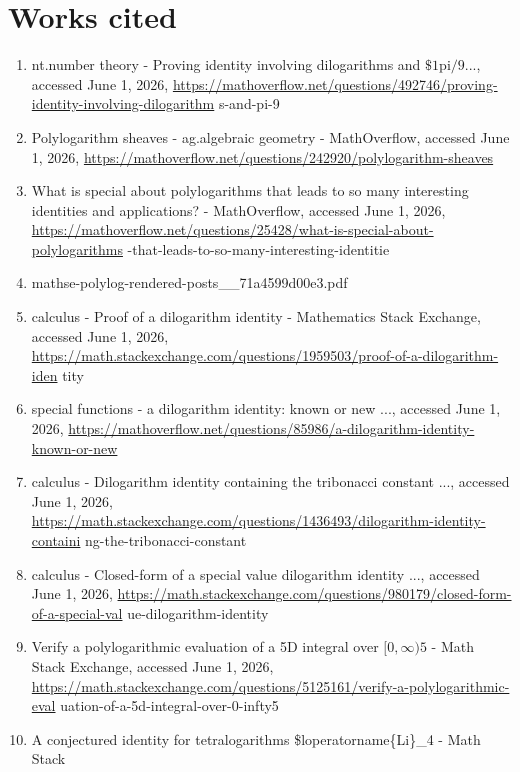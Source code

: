 \documentclass[10pt]{article}
\begin{document}
\section*{Works cited}
\begin{enumerate}
  \item nt.number theory - Proving identity involving dilogarithms and $\$ 1 \mathrm{pi} / 9$..., accessed June 1, 2026, \href{https://mathoverflow.net/questions/492746/proving-identity-involving-dilogarithm}{https://mathoverflow.net/questions/492746/proving-identity-involving-dilogarithm} s-and-pi-9
  \item Polylogarithm sheaves - ag.algebraic geometry - MathOverflow, accessed June 1, 2026, \href{https://mathoverflow.net/questions/242920/polylogarithm-sheaves}{https://mathoverflow.net/questions/242920/polylogarithm-sheaves}
  \item What is special about polylogarithms that leads to so many interesting identities and applications? - MathOverflow, accessed June 1, 2026, \href{https://mathoverflow.net/questions/25428/what-is-special-about-polylogarithms}{https://mathoverflow.net/questions/25428/what-is-special-about-polylogarithms} -that-leads-to-so-many-interesting-identitie
  \item mathse-polylog-rendered-posts\_\_71a4599d00e3.pdf
  \item calculus - Proof of a dilogarithm identity - Mathematics Stack Exchange, accessed June 1, 2026, \href{https://math.stackexchange.com/questions/1959503/proof-of-a-dilogarithm-iden}{https://math.stackexchange.com/questions/1959503/proof-of-a-dilogarithm-iden} tity
  \item special functions - a dilogarithm identity: known or new ..., accessed June 1, 2026, \href{https://mathoverflow.net/questions/85986/a-dilogarithm-identity-known-or-new}{https://mathoverflow.net/questions/85986/a-dilogarithm-identity-known-or-new}
  \item calculus - Dilogarithm identity containing the tribonacci constant ..., accessed June 1, 2026, \href{https://math.stackexchange.com/questions/1436493/dilogarithm-identity-containi}{https://math.stackexchange.com/questions/1436493/dilogarithm-identity-containi} ng-the-tribonacci-constant
  \item calculus - Closed-form of a special value dilogarithm identity ..., accessed June 1, 2026, \href{https://math.stackexchange.com/questions/980179/closed-form-of-a-special-val}{https://math.stackexchange.com/questions/980179/closed-form-of-a-special-val} ue-dilogarithm-identity
  \item Verify a polylogarithmic evaluation of a 5D integral over $[0, \infty) 5$ - Math Stack Exchange, accessed June 1, 2026, \href{https://math.stackexchange.com/questions/5125161/verify-a-polylogarithmic-eval}{https://math.stackexchange.com/questions/5125161/verify-a-polylogarithmic-eval} uation-of-a-5d-integral-over-0-infty5
  \item A conjectured identity for tetralogarithms \$loperatorname\{Li\}\_4 - Math Stack
\end{enumerate}
\end{document}

